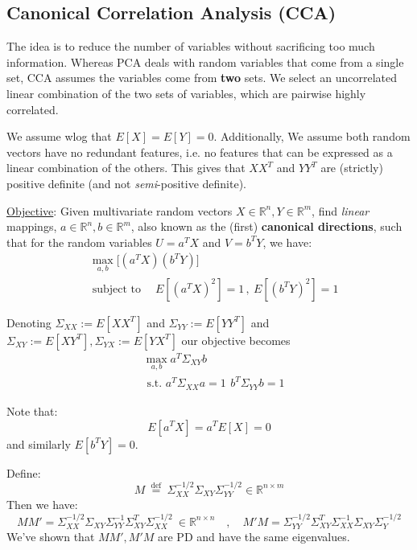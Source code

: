 \documentclass{article}
\begin{document}
\subsection{Canonical Correlation Analysis (CCA)}
The idea is to reduce the number of variables without sacrificing too much information. 
Whereas PCA deals with random variables that come from a single set, CCA assumes the variables come from \textbf{two} sets. We select an uncorrelated linear combination of the two sets of variables, which are pairwise highly correlated.

We assume wlog that $E[X] = E[Y] = 0$. Additionally, We assume both random vectors have no redundant features, i.e. no features that can be expressed as a linear combination of the others. This gives that $XX^{T}$ and $YY^{T}$ are (strictly) positive definite (and not \textit{semi}-positive definite). 

\ul{Objective}: Given multivariate random vectors $X \in \mathbb{R}^{n}, Y \in \mathbb{R}^{m}$, find \textit{linear} mappings, $a \in \mathbb{R}^{n}, b \in \mathbb{R}^{m}$, also known as the (first) \textbf{canonical directions}, such that for the random variables $U = a^{T}X$ and $V = b^{T}Y$, we have:
\begin{equation} \label{CCAObjective1}
\begin{aligned}
  & \max_{a,b} \big[ (a^{T} X) (b^{T} Y) \big] \\
  & \operatorname*{\text{subject to}} \quad  E \left[ (a^{T}X)^2 \right] = 1 \,, \  E \left[ (b^{T}Y)^2 \right] = 1 
 \end{aligned}
\end{equation}

Denoting $\Sigma_{XX} :=E[X X^{T}]$ and $\Sigma_{YY} := E[Y Y^{T}]$ and $\Sigma_{XY} := E[X Y^{T}], \Sigma_{YX} := E[Y X^{T}]$ 
our objective becomes
\begin{align} \label{eq:CCAObjective2}
& \max_{a,b} a^{T} \Sigma_{XY} b \\ 
  & \text{ s.t. } a^{T} \Sigma_{XX}a = 1 \, \ b^{T} \Sigma_{YY} b = 1 \label{eq:CCAConstraints}
\end{align}

Note that:
\[
  E[a^{T} X] = a^{T} E[X] = 0
\]
and similarly $E[b^{T} Y] = 0$. 

Define:
\[
  M \stackrel{\text{ def }}{=}  \Sigma_{XX}^{-1/2} \Sigma_{XY} \Sigma_{YY}^{-1/2} \in \mathbb{R}^{n \times  m}  
\]
Then we have:
\[
  MM' = \Sigma_{XX}^{-1/2} \Sigma_{XY} \Sigma_{YY} ^{-1} \Sigma_{XY}^{T} \Sigma_{XX}^{-1/2} \ \in \mathbb{R}^{n \times n} \quad, \quad  M'M   = \Sigma_{YY}^{-1/2} \Sigma_{XY}^{T} \Sigma_{XX} ^{-1} \Sigma_{XY} \Sigma_{Y}^{-1/2}
\]
We've shown that $MM', M'M$ are PD and have the same eigenvalues. 
\end{document}
